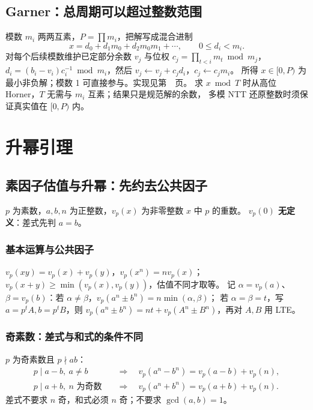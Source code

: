 \subsection{Garner：总周期可以超过整数范围}\label{knowledge-garner}
模数 $m_i$ 两两互素，$P=\prod m_i$，把解写成混合进制
\[
x=d_0+d_1m_0+d_2m_0m_1+\cdots,\qquad 0\le d_i<m_i.
\]
对每个后续模数维护已定部分余数 $v_j$ 与位权 $c_j=\prod_{t<i}m_t\bmod m_j$，
$d_i=(b_i-v_i)c_i^{-1}\bmod m_i$，然后 $v_j\gets v_j+c_jd_i$，$c_j\gets c_jm_i$。
所得 $x\in[0,P)$ 为最小非负解；模数 1 可直接参与。实现见第~\pageref{compact-garner}~页。
求 $x\bmod T$ 时从高位 Horner，$T$ 无需与 $m_i$ 互素；结果只是规范解的余数，
多模 NTT 还原整数时须保证真实值在 $[0,P)$ 内。


\newpage

\section{升幂引理}

\subsection{素因子估值与升幂：先约去公共因子}\label{knowledge-lte}
$p$ 为素数，$a,b,n$ 为正整数，$v_p(x)$ 为非零整数 $x$ 中 $p$ 的重数。
\textbf{$v_p(0)$ 无定义}：差式先判 $a=b$。

\subsubsection{基本运算与公共因子}
$v_p(xy)=v_p(x)+v_p(y)$，$v_p(x^n)=nv_p(x)$；$v_p(x+y)\ge\min(v_p(x),v_p(y))$，估值不同才取等。
记 $\alpha=v_p(a)$、$\beta=v_p(b)$：若 $\alpha\ne\beta$，$v_p(a^n\pm b^n)=n\min(\alpha,\beta)$；
若 $\alpha=\beta=t$，写 $a=p^tA,b=p^tB$，则 $v_p(a^n\pm b^n)=nt+v_p(A^n\pm B^n)$，再对 $A,B$ 用 LTE。

\subsubsection{奇素数：差式与和式的条件不同}
$p$ 为奇素数且 $p\nmid ab$：
\[
\begin{aligned}
p\mid a-b,\ a\ne b
&\quad\Longrightarrow\quad v_p(a^n-b^n)=v_p(a-b)+v_p(n),\\
p\mid a+b,\ n\text{ 为奇数}
&\quad\Longrightarrow\quad v_p(a^n+b^n)=v_p(a+b)+v_p(n).
\end{aligned}
\]
差式不要求 $n$ 奇，和式必须 $n$ 奇；不要求 $\gcd(a,b)=1$。

